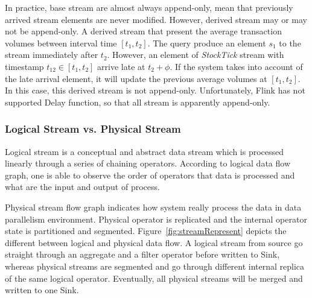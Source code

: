 In practice, base stream are almost always append-only, mean that previously arrived stream elements are never modified. However, derived stream may or may not be append-only\cite{Golab:2010}. A derived stream that present the average transaction volumes between interval time $[t_1, t_2]$. The query produce an element $s_1$ to the stream immediately after $t_2$. However, an element of \textit{StockTick} stream with timestamp 
$t_{12} \in [t_1,t_2]$ arrive late at $t_2+\phi$. If the system takes into account of the late arrival element, it will update the previous average volumes at $[t_1, t_2]$. In this case, this derived stream is not append-only. Unfortunately, Flink has not supported Delay function, so that all stream is apparently append-only.




\subsubsection*{Logical Stream vs. Physical Stream}

Logical stream is a conceptual and abstract data stream which is processed linearly through a series of chaining operators. According to logical data flow graph, one is able to observe the order of operators that data is processed and what are the input and output of process.

Physical stream flow graph indicates how system really process the data in data parallelism environment. Physical operator is replicated and the internal operator state is partitioned and segmented. Figure~\ref{fig:streamRepresent} depicts the different between logical and physical data flow.
A logical stream from source go straight through an aggregate and a filter operator before written to Sink, whereas physical streams are segmented and go through different internal replica of the same logical operator. Eventually, all physical streams will be merged and written to one Sink. 


